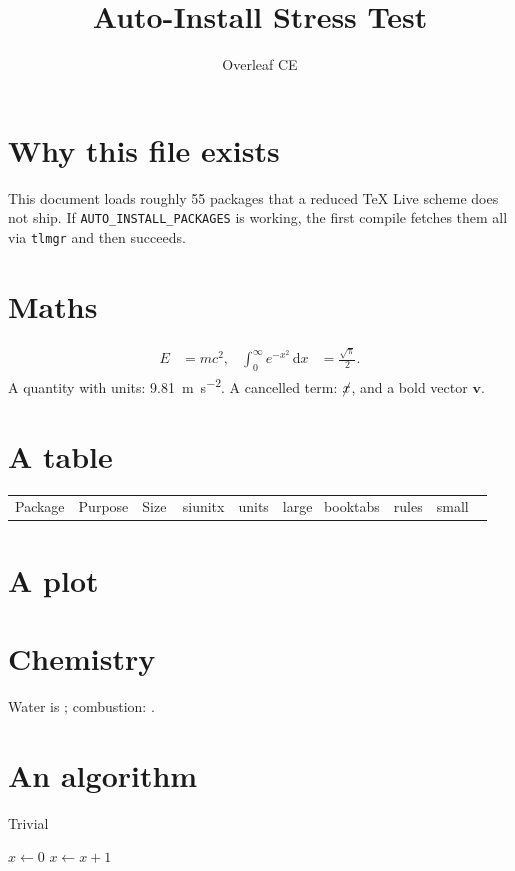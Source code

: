 \documentclass[11pt,a4paper]{article}
\title{Auto-Install Stress Test}
\author{Overleaf CE}
\begin{document}
\maketitle

\section{Why this file exists}
This document loads roughly 55 packages that a reduced \TeX{} Live scheme does
not ship. If \texttt{AUTO\_INSTALL\_PACKAGES} is working, the first compile
fetches them all via \texttt{tlmgr} and then succeeds.

\section{Maths}
\begin{align}
  E &= mc^2, & \int_0^\infty e^{-x^2}\,\mathrm{d}x &= \frac{\sqrt{\uppi}}{2}.
\end{align}
A quantity with units: \SI{9.81}{\metre\per\second\squared}. A cancelled
term: $\cancel{x}$, and a bold vector $\bm{v}$.

\section{A table}
\begin{tabular}{@{}lcr@{}}
  \toprule
  Package & Purpose & Size \
  \midrule
  siunitx & units & large \
  booktabs & rules & small \
  \bottomrule
\end{tabular}

\section{A plot}

\section{Chemistry}
Water is ; combustion: .

\section{An algorithm}
\begin{algorithm}[H]
\caption{Trivial}
\begin{algorithmic}[1]
  \State $x \gets 0$
   \State $x \gets x + 1$ \EndWhile
\end{algorithmic}
\end{algorithm}
\end{document}
